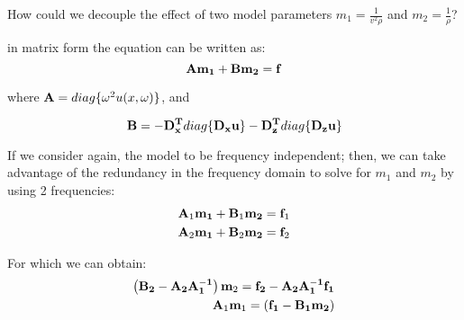 \documentclass[10pt]{article}
\begin{document}
How could we decouple the effect of two model parameters $m_1 = \frac{1}{v^2\rho}$ and $m_2 = \frac{1}{\rho}$?


in matrix form the equation can be written as:
\begin{equation}
  {\bf A} {\bf m_1} + {\bf B} {\bf m_2} = {\bf f}
\end{equation}

where ${\bf A} = diag\{\omega^2 u(x,\omega)\}$, and 

\begin{equation}
 {\bf B} = -{\bf D_x^T}{ diag\{\bf D_x u\}} - {\bf D_z^T}{ diag\{\bf D_z u\}} 
\end{equation}

If we consider again, the model to be frequency independent; then, we can take advantage of the 
redundancy in the frequency domain to solve for $m_1$ and $m_2$ by using 2 frequencies:
\begin{align}
  {\bf A}_1 {\bf m_1} + {\bf B}_1 {\bf m_2} = {\bf f}_1 \\
  {\bf A}_2 {\bf m_1} + {\bf B}_2 {\bf m_2} = {\bf f}_2
\end{align}

For which we can obtain:
\begin{align}
  \left( {\bf B_2}-{\bf A_2}{\bf A_1^{-1}} \right) {\bf m}_2 = {\bf f_2} -{\bf A_2}{\bf A_1^{-1} f_1} \\
 {\bf A}_1 {\bf m}_1 = ({\bf f_1}-{\bf B_1 m_2}) 
\end{align}
\end{document}
